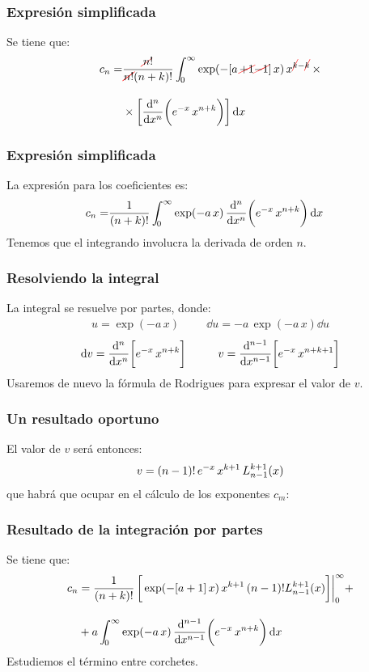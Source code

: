 \documentclass[12pt]{beamer}
\newcommand{\Cancel}[2][black]{{\color{#1}\cancel{\color{black}#2}}}
\begin{document}
\begin{frame}
\frametitle{Expresión simplificada}
Se tiene que:
\pause
\begin{align*}
c_{n} = &\dfrac{ \Cancel[red]{n}!}{\Cancel[red]{n!} (n+ k)!} \, \scaleint{5ex}_{\bs 0}^{\infty} \exp( -[ a \, \Cancel[red]{+ 1} \Cancel[red]{- 1}] \, x) \, x^{\Cancel[red]{k}-\Cancel[red]{k}} \, \times \\[1em]  
&\times \bigg[ \dv[n]{x} \bigg( e^{-x} \, x^{n+k} \bigg) \bigg] \dd{x}
\end{align*}
\end{frame}
\begin{frame}
\frametitle{Expresión simplificada}
La expresión para los coeficientes es:
\begin{align*}
c_{n} = &\dfrac{ 1}{(n+ k)!} \, \scaleint{5ex}_{\bs 0}^{\infty} \exp( - a \, x) \, \dv[n]{x} \bigg( e^{-x} \, x^{n+k} \bigg) \dd{x}
\end{align*}
Tenemos que el integrando involucra la derivada de orden $n$.
\end{frame}
\begin{frame}
\frametitle{Resolviendo la integral}
La integral se resuelve por partes, donde:
\begin{align*}
u = \exp(-a \, x) \hspace{1cm} \dd{u} = - a \, \exp(-a \, x) \dd{u} 
\end{align*}
\pause
\begin{align*}
\dd{v} = \dv[n]{x} \bigg[ e^{-x} \, x^{n+k} \bigg] \hspace{1cm} v = \dv[n-1]{x} \bigg[ e^{-x} \, x^{n+k+1} \bigg]
\end{align*}
\pause
Usaremos de nuevo la fórmula de Rodrigues para expresar el valor de $v$.
\end{frame}
\begin{frame}
\frametitle{Un resultado oportuno}
El valor de $v$ será entonces:
\pause
\begin{align*}
v = (n - 1)! \, e^{-x} \, x^{k+1} \, \scaleto{L_{n-1}^{k+1}(x)}{3ex}
\end{align*}
\pause
que habrá que ocupar en el cálculo de los exponentes $c_{m}$:
\end{frame}
\begin{frame}
\frametitle{Resultado de la integración por partes}
Se tiene que:
\begin{align*}
c_{n} &= \dfrac{ 1}{(n+ k)!} \, \bigg[ \exp(-[a + 1] \, x) \, x^{k+1} \, (n - 1)! L_{n-1}^{k+1}(x) \bigg] \bigg\vert_{0}^{\infty} + \\[1em]
&+ a \, \scaleint{5ex}_{\bs 0}^{\infty} \exp( - a \, x) \, \dv[n-1]{x} \bigg( e^{-x} \, x^{n+k} \bigg) \dd{x}
\end{align*}
\pause
Estudiemos el término entre corchetes.
\end{frame}
\end{document}
